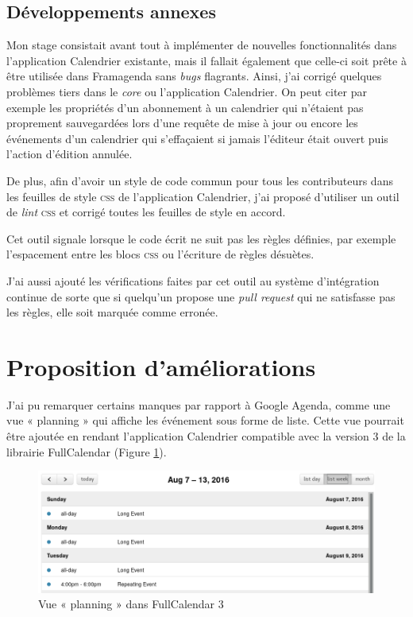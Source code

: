 \documentclass[10pt,a4paper, twoside]{report}
\begin{document}
	\subsection{Développements annexes}
	
	Mon stage consistait avant tout à implémenter de nouvelles fonctionnalités dans l'application Calendrier existante, mais il fallait également que celle-ci soit prête à être utilisée dans Framagenda sans \textit{bugs} flagrants. Ainsi, j'ai corrigé quelques problèmes tiers dans le \textit{core} ou l'application Calendrier.
	On peut citer par exemple les propriétés d'un abonnement à un calendrier qui n'étaient pas proprement sauvegardées lors d'une requête de mise à jour ou encore les événements d'un calendrier qui s'effaçaient si jamais l'éditeur était ouvert puis l'action d'édition annulée.
	
	De plus, afin d'avoir un style de code commun pour tous les contributeurs dans les feuilles de style \textsc{css} de l'application Calendrier, j'ai proposé d'utiliser un outil de \textit{lint} \textsc{css} et corrigé toutes les feuilles de style en accord. 
	
	Cet outil signale lorsque le code écrit ne suit pas les règles définies, par exemple l'espacement entre les blocs \textsc{css} ou l'écriture de règles désuètes.
	
	J'ai aussi ajouté les vérifications faites par cet outil au système d'intégration continue de sorte que si quelqu'un propose une \textit{pull request} qui ne satisfasse pas les règles, elle soit marquée comme erronée.

	\section{Proposition d'améliorations}
	J'ai pu remarquer certains manques par rapport à Google Agenda, comme une vue « planning » qui affiche les événement sous forme de liste. Cette vue pourrait être ajoutée en rendant l'application Calendrier compatible avec la version 3 de la librairie FullCalendar (Figure \ref{planning-fullcalendar}).
	
	\begin{figure}[ht]
		\centering
		\centerline{\includegraphics[width=1.25\textwidth]{images/fullcalendar-3.png}}
		\caption{Vue « planning » dans FullCalendar 3}
		\label{planning-fullcalendar}
	\end{figure}
	
\end{document}

